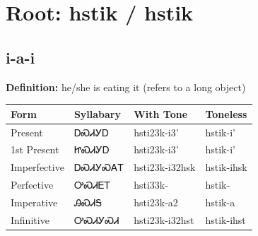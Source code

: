 \documentclass{article}%
\begin{document}
%
\normalsize%
\section*{Root: hstik / hstik}%
\subsection*{i-a-i}%
\textbf{Definition: }%
he/she is eating it (refers to a long object)%
\\[0.5em]%
\begin{tabular}{|l|l|l|l|}%
\hline%
\textbf{Form}&\textbf{Syllabary}&\textbf{With Tone}&\textbf{Toneless}\\%
\hline%
Present&ᎠᏍᏗᎩᎠ&hsti23k{-}i3'&hstik{-}i'\\%
1st Present&ᏥᏍᏗᎩᎠ&hsti23k{-}i3'&hstik{-}i'\\%
Imperfective&ᎠᏍᏗᎩᏍᎪᎢ&hsti23k{-}i32hsk&hstik{-}ihsk\\%
Perfective&ᎤᏍᏗᎬᎢ&hsti33k{-}&hstik{-}\\%
Imperative&ᎯᏍᏗᎦ&hsti23k{-}a2&hstik{-}a\\%
Infinitive&ᎤᏍᏗᎩᏍᏗ&hsti23k{-}i32hst&hstik{-}ihst\\%
\hline%
\end{tabular}%
\\[1em]%
\end{document}
